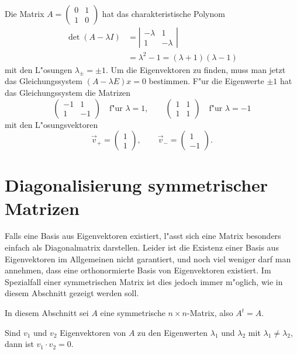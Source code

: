 \begin{beispiel}
Die Matrix $A=\begin{pmatrix}0&1\\1&0\end{pmatrix}$ hat das 
charakteristische Polynom
\begin{align*}
\det(A-\lambda I)&=\left|\begin{matrix}-\lambda&1\\1&-\lambda\end{matrix}\right|\\
&=\lambda^2-1=(\lambda+1)(\lambda-1)
\end{align*}
mit den L"osungen $\lambda_\pm=\pm1$.
Um die Eigenvektoren zu finden, muss
man jetzt das Gleichungssystem $(A-\lambda E)x=0$ bestimmen.
F"ur die Eigenwerte $\pm1$ hat das Gleichungssystem die Matrizen
\[
\begin{pmatrix}
-1&1\\1&-1
\end{pmatrix}\quad \text{f"ur $\lambda=1$},\qquad
\begin{pmatrix}
1&1\\1&1
\end{pmatrix}\quad\text{f"ur $\lambda=-1$}
\]
mit den L"osungsvektoren 
\[
\vec v_+=\begin{pmatrix}1\\1\end{pmatrix},
\qquad
\vec v_-=\begin{pmatrix}1\\-1\end{pmatrix}.
\]
\end{beispiel}

\section{Diagonalisierung symmetrischer Matrizen\label{section-diag-sym}}
Falls eine Basis aus Eigenvektoren existiert, l"asst sich eine Matrix
besonders einfach als Diagonalmatrix darstellen.
Leider ist die Existenz
einer Basis aus Eigenvektoren im Allgemeinen nicht garantiert, und noch
viel weniger darf man annehmen, dass eine orthonormierte Basis
von Eigenvektoren existiert.
Im Spezialfall einer symmetrischen Matrix
ist dies jedoch immer m"oglich, wie in diesem Abschnitt gezeigt werden
soll.

In diesem Abschnitt sei $A$ eine symmetrische $n\times n$-Matrix,
also  $A^t=A$.

\begin{hilfssatz}
Sind $v_1$ und $v_2$ Eigenvektoren von $A$ zu den Eigenwerten 
$\lambda_1$ und $\lambda_2$ mit $\lambda_1\ne \lambda_2$, dann
ist $v_1\cdot v_2=0$.
\end{hilfssatz}

